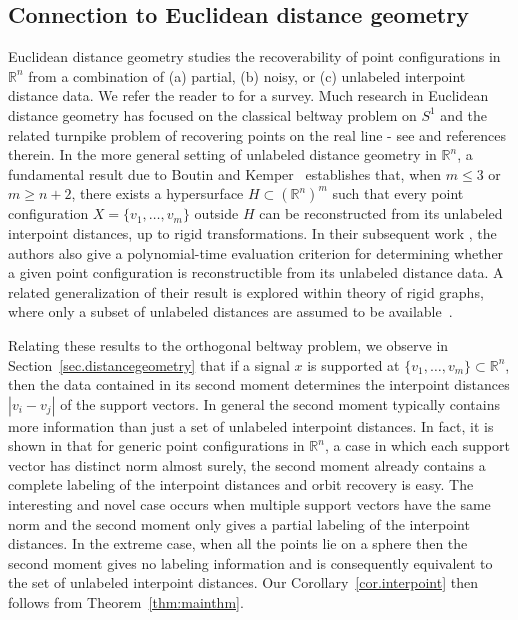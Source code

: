 \documentclass{article}
\theoremstyle{definition}
\renewcommand{\r}{\mathbb{R}}
\renewcommand{\|}{|}
\begin{document}
\subsection{Connection to Euclidean distance geometry} 
Euclidean distance geometry studies the recoverability of point configurations in $\r^n$ from a combination of (a) partial, (b) noisy, or (c) unlabeled interpoint distance data. We refer the reader to \cite{dokmanic2015euclidean} for a survey. 
Much research in Euclidean distance geometry has focused on the classical beltway problem on $S^1$ and the related turnpike problem of recovering points on the real line - see \cite{huang2021reconstructing, connelly2024reconstruction} and references therein. In the more general setting of unlabeled distance geometry in $\r^n$, a fundamental result due to Boutin and Kemper~\cite[Theorem~1.6]{boutin2003reconstructing} establishes that, when $m \leq 3$ or $m \geq n+2$, there exists a hypersurface $H \subset (\mathbb{R}^n)^m$ such that every point configuration $X = \{v_1, \dots, v_m\}$ outside $H$ can be reconstructed from its unlabeled interpoint distances, up to rigid transformations. In their subsequent work \cite{boutin2007which}, the authors also give a polynomial-time evaluation criterion for determining whether a given point configuration is reconstructible from its unlabeled distance data. A related generalization of their result is explored within theory of rigid graphs, where only a subset of unlabeled distances are assumed to be available~\cite{gortler2019generic, gkioulekas2024trilateration}.

Relating these results to the orthogonal beltway problem, we observe in Section~\ref{sec.distancegeometry} that if a signal $x$ is supported at $\{v_1, \dots, v_m\}\subset \r^n$, then the data contained in its second moment  determines the interpoint
distances $\|v_i-v_j\|$ of the support vectors. In general the second moment typically contains more information than just a set of unlabeled interpoint distances. In fact, it is shown in \cite{bendory2024beltway} that for generic point configurations in $\r^n$, a case in which each support vector has distinct norm almost surely, the second moment already contains a complete labeling of the interpoint distances and orbit recovery is easy. The interesting and novel case occurs when multiple support vectors have the same norm and the second moment only gives 
a partial labeling of the interpoint distances. In the extreme case, when all the points lie on a sphere then the second moment gives no labeling information and is consequently
equivalent to the set
of unlabeled interpoint distances. Our Corollary~\ref{cor.interpoint} then follows from
Theorem~\ref{thm:mainthm}.
\end{document}
